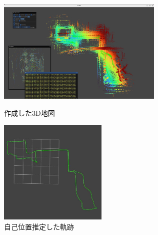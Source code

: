\begin{figure}[htbp]
    \centering
    \begin{minipage}[b]{0.45\hsize}
       \centering
       \includegraphics[height=5cm]{fig/tsukuba_map.jpeg}
       \caption{作成した3D地図}
       \label{fig:tsukuba_map}
    \end{minipage}
    \begin{minipage}[b]{0.45\hsize}
       \centering
       \includegraphics[height=5cm]{fig/trajectry.jpeg}
       \caption{自己位置推定した軌跡}
       \label{fig:trajectry}
    \end{minipage}
  \end{figure}